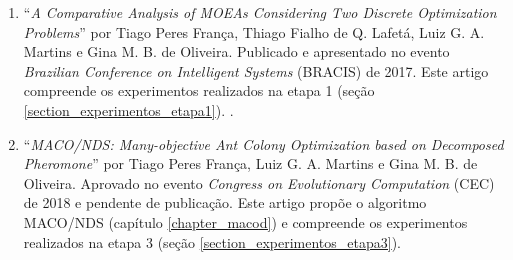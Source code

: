 \begin{enumerate}
	\item ``\textit{A Comparative Analysis of MOEAs Considering Two Discrete Optimization Problems}'' por Tiago Peres França, Thiago Fialho de Q. Lafetá, Luiz G. A. Martins e Gina M. B. de Oliveira. Publicado e apresentado no evento \textit{Brazilian Conference on Intelligent Systems} (BRACIS) de 2017. Este artigo compreende os experimentos realizados na etapa 1 (seção \ref{section_experimentos_etapa1}). \cite{Franca2017}.
	\item ``\textit{MACO/NDS: Many-objective Ant Colony Optimization based on Decomposed
		Pheromone}'' por Tiago Peres França, Luiz G. A. Martins e Gina M. B. de Oliveira. Aprovado no evento \textit{Congress on Evolutionary Computation} (CEC) de 2018 e pendente de publicação. Este artigo propõe o algoritmo MACO/NDS (capítulo \ref{chapter_macod}) e compreende os experimentos realizados na etapa 3 (seção \ref{section_experimentos_etapa3}).
\end{enumerate}